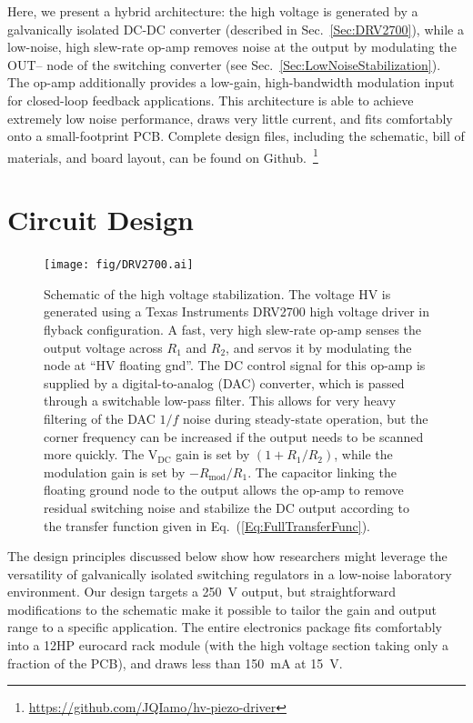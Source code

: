 \documentclass[aip,rsi,reprint]{revtex4-1} %
\begin{document}
Here, we present a hybrid architecture: the high voltage is generated by a galvanically isolated DC-DC converter (described in Sec.~\ref{Sec:DRV2700}), while a low-noise, high slew-rate op-amp removes noise at the output by modulating the {OUT--} node of the switching converter (see Sec.~\ref{Sec:LowNoiseStabilization}).
The op-amp additionally provides a low-gain, high-bandwidth modulation input for closed-loop feedback applications.
This architecture is able to achieve extremely low noise performance, draws very little current, and fits comfortably onto a small-footprint PCB.
Complete design files, including the schematic, bill of materials, and board layout, can be found on Github.~\footnote{\protect\url{https://github.com/JQIamo/hv-piezo-driver}}



\section{Circuit Design}
\label{Sec:Circuit}

\begin{figure}[t]
\texttt{[image: fig/DRV2700.ai]}
\caption{Schematic of the high voltage stabilization.
The voltage HV is generated using a Texas Instruments DRV2700 high voltage driver in flyback configuration.
A fast, very high slew-rate op-amp senses the output voltage across $R_1$ and $R_2$, and servos it by modulating the node at ``HV floating gnd''.
The DC control signal for this op-amp is supplied by a digital-to-analog (DAC) converter, which is passed through a switchable low-pass filter. This allows for very heavy filtering of the DAC $1/f$ noise during steady-state operation, but the corner frequency can be increased if the output needs to be scanned more quickly.
The $\text{V}_{\text{DC}}$ gain is set by $\left(1+R_1/R_2\right)$, while the modulation gain is set by $-R_{\text{mod}}/R_1$.
The capacitor linking the floating ground node to the output allows the op-amp to remove residual switching noise and stabilize the DC output according to the transfer function given in Eq.~(\ref{Eq:FullTransferFunc}).
\label{Fig:PiezoCircuit}}
\end{figure}

The design principles discussed below show how researchers might leverage the versatility of galvanically isolated switching regulators in a low-noise laboratory environment. 
Our design targets a \SI{250}{\volt} output, but straightforward modifications to the schematic make it possible to tailor the gain and output range to a specific application.
The entire electronics package fits comfortably into a 12HP eurocard rack module (with the high voltage section taking only a fraction of the PCB), and draws less than \SI{150}{\milli\ampere} at \SI{15}{\volt}.
\end{document}
